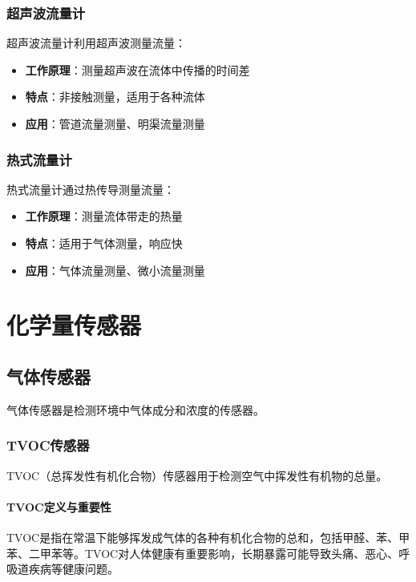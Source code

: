 \documentclass[12pt,UTF8]{ctexbook}
\begin{document}
\subsection{超声波流量计}

超声波流量计利用超声波测量流量：

\begin{itemize}[leftmargin=2cm]
	\item \textbf{工作原理}：测量超声波在流体中传播的时间差
	\item \textbf{特点}：非接触测量，适用于各种流体
	\item \textbf{应用}：管道流量测量、明渠流量测量
\end{itemize}

\subsection{热式流量计}

热式流量计通过热传导测量流量：

\begin{itemize}[leftmargin=2cm]
	\item \textbf{工作原理}：测量流体带走的热量
	\item \textbf{特点}：适用于气体测量，响应快
	\item \textbf{应用}：气体流量测量、微小流量测量
\end{itemize}

\chapter{化学量传感器}
\section{气体传感器}
气体传感器是检测环境中气体成分和浓度的传感器。

\subsection{TVOC传感器}
TVOC（总挥发性有机化合物）传感器用于检测空气中挥发性有机物的总量。

\subsubsection{TVOC定义与重要性}
TVOC是指在常温下能够挥发成气体的各种有机化合物的总和，包括甲醛、苯、甲苯、二甲苯等。TVOC对人体健康有重要影响，长期暴露可能导致头痛、恶心、呼吸道疾病等健康问题。
\end{document}
